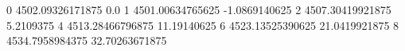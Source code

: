 0 4502.09326171875 0.0
1 4501.00634765625 -1.0869140625
2 4507.30419921875 5.2109375
4 4513.28466796875 11.19140625
6 4523.13525390625 21.0419921875
8 4534.7958984375 32.70263671875

